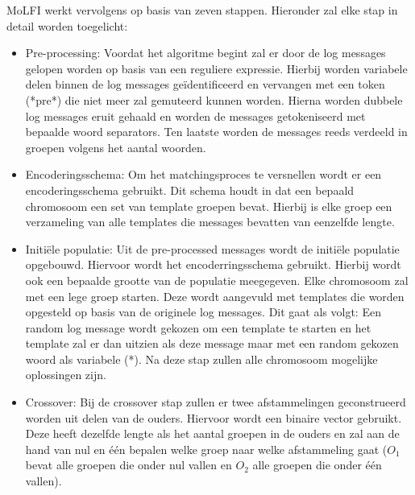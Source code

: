 MoLFI werkt vervolgens op basis van zeven stappen. Hieronder zal elke stap in detail worden toegelicht:
\begin{itemize}
    \item Pre-processing: Voordat het algoritme begint zal er door de log messages gelopen worden op basis van een reguliere expressie. Hierbij worden variabele delen binnen de log messages geïdentificeerd en vervangen met een token (*pre*) die niet meer zal gemuteerd kunnen worden. Hierna worden dubbele log messages eruit gehaald en worden de messages getokeniseerd met bepaalde woord separators. Ten laatste worden de messages reeds verdeeld in groepen volgens het aantal woorden.\\
    \item Encoderingsschema: Om het matchingsproces te versnellen wordt er een encoderingsschema gebruikt. Dit schema houdt in dat een bepaald chromosoom een set van template groepen bevat. Hierbij is elke groep een verzameling van alle templates die messages bevatten van eenzelfde lengte.\\
    \item Initiële populatie: Uit de pre-processed messages wordt de initiële populatie opgebouwd. Hiervoor wordt het encoderringsschema gebruikt. Hierbij wordt ook een bepaalde grootte van de populatie meegegeven. Elke chromosoom zal met een lege groep starten. Deze wordt aangevuld met templates die worden opgesteld op basis van de originele log messages. Dit gaat als volgt: Een random log message wordt gekozen om een template te starten en het template zal er dan uitzien als deze message maar met een random gekozen woord als variabele (*). Na deze stap zullen alle chromosoom mogelijke oplossingen zijn.\\
    \item Crossover: Bij de crossover stap zullen er twee afstammelingen geconstrueerd worden uit delen van de ouders. Hiervoor wordt een binaire vector gebruikt. Deze heeft dezelfde lengte als het aantal groepen in de ouders en zal aan de hand van nul en één bepalen welke groep naar welke afstammeling gaat ($O_{1}$ bevat alle groepen die onder nul vallen en $O_{2}$ alle groepen die onder één vallen).\\

\end{itemize}
